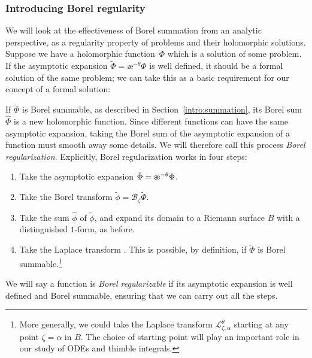 \documentclass[10pt,a4paper]{amsart}
\newcommand{\series}[1]{\tilde{#1}}
\newcommand{\laplace}{\mathcal{L}}
\newcommand{\borel}{\mathcal{B}}
\newcommand{\aexp}{\text{\rm \ae}}
\numberwithin{equation}{section}
\begin{document}
\subsubsection{Introducing Borel regularity}
%
We will look at the effectiveness of Borel summation from an analytic perspective, as a regularity property of problems and their holomorphic solutions. Suppose we have a holomorphic function~$\Phi$ which is a solution of some problem. If the asymptotic expansion $\series{\Phi} = \text{\ae}^{-\theta} \Phi$ is well defined, it should be a formal solution of the same problem; we can take this as a basic requirement for our concept of a formal solution:
\begin{center}
\end{center}
If $\series{\Phi}$ is Borel summable, as described in Section~\ref{intro:summation}, its Borel sum $\hat{\Phi}$ is a new holomorphic function.
Since different functions can have the same asymptotic expansion, taking the Borel sum of the asymptotic expansion of a function must smooth away some details. We will therefore call this process {\em Borel regularization}. Explicitly, Borel regularization works in four steps:
\begin{enumerate}\itemsep=0pt
\item[(1)] Take the asymptotic expansion $\series{\Phi} = \aexp^{-\theta} \Phi$.
\item[(2)] Take the Borel transform $\series{\phi} = \borel_\zeta \series{\Phi}$.
\item[(3)] Take the sum $\hat{\phi}$ of $\series{\phi}$, and expand its domain to a Riemann surface $B$ with a distinguished $1$-form, as before.
\item[(4)] Take the Laplace transform \smash{$\hat{\Phi} = \laplace_{\zeta, 0}^\theta \hat{\phi}$}. This is possible, by definition, if $\series{\Phi}$ is Borel summable.\footnote{More generally, we could take the Laplace transform $\laplace^\theta_{\zeta, \alpha}$ starting at any point $\zeta = \alpha$ in $B$. The choice of starting point will play an important role in our study of ODEs and thimble integrals.}
\end{enumerate}
We will say a function is {\em Borel regularizable} if its asymptotic expansion is well defined and Borel summable, ensuring that we can carry out all the steps.
\end{document}
